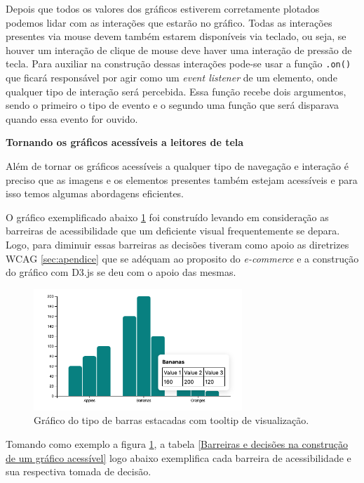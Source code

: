 {Depois que todos os valores dos gráficos estiverem corretamente plotados podemos lidar com as interações que estarão no gráfico. Todas as interações presentes via mouse devem também estarem disponíveis via teclado, ou seja, se houver um interação de clique de mouse deve haver uma interação de pressão de tecla. Para auxiliar na construção dessas interações pode-se usar a função \lstinline{.on()} que ficará responsável por agir como um \textit{event listener} de um elemento, onde qualquer tipo de interação será percebida. Essa função recebe dois argumentos, sendo o primeiro o tipo de evento e o segundo uma função que será disparava quando essa evento for ouvido. 


\textbf{Tornando os gráficos acessíveis a leitores de tela}

{Além de tornar os gráficos acessíveis a qualquer tipo de navegação e interação é preciso que as imagens e os elementos presentes também estejam acessíveis e para isso temos algumas abordagens eficientes. 

O gráfico exemplificado abaixo \ref{fig:grafico-d3} foi construído levando em consideração as barreiras de acessibilidade que um deficiente visual frequentemente se depara. Logo, para diminuir essas barreiras as decisões tiveram como apoio as diretrizes WCAG \ref{sec:apendice} que se adéquam ao proposito do \textit{e-commerce} e a construção do gráfico com D3.js \cite{D3} se deu com o apoio das mesmas. 


\begin{figure}[ht]
  	\center
    \includegraphics[width=0.7\textwidth]{images/barchart-tooltip.png}
    \caption{Gráfico do tipo de barras estacadas com tooltip de visualização.}
    \label{fig:grafico-d3}
\end{figure} 

}

\newpage
{

{Tomando como exemplo a figura \ref{fig:grafico-d3}, a tabela \ref{Barreiras e decisões na construção de um gráfico acessível} logo abaixo exemplifica cada barreira de acessibilidade e sua respectiva tomada de decisão.}
\vspace*{20px}

}}
